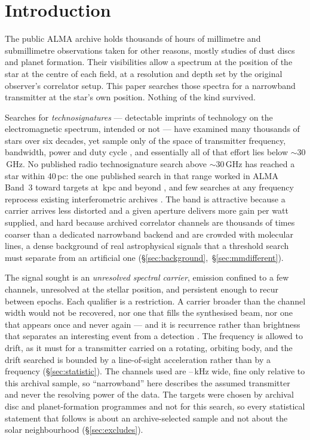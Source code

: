 \section{Introduction}
\label{sec:intro}

The public ALMA archive holds thousands of hours of millimetre and
submillimetre observations taken for other reasons, mostly studies of dust
discs and planet formation. Their visibilities allow a spectrum at the
position of the star at the centre of each field, at a resolution and depth
set by the original observer's correlator setup. This paper searches those
spectra for a narrowband transmitter at the star's own position. Nothing of
the kind survived.

Searches for \emph{technosignatures} --- detectable imprints of technology on
the electromagnetic spectrum, intended or not
\citep{Sheikh2020,SETIreview2025} --- have examined many thousands of stars
over six decades, yet sample only \HaystackFrac{} of the space of transmitter
frequency, bandwidth, power and duty cycle \citep{Wright2018}, and
essentially all of that effort lies below ${\sim}30$\,GHz. No published radio
technosignature search above ${\sim}30$\,GHz has reached a star within
40\,pc: the one published search in that range worked in ALMA Band~3 toward
targets at \MasonNearKpc\,kpc and beyond \citep{Mason2025}, and few searches
at any frequency reprocess existing interferometric archives
\citep{White2026}. The band is attractive because a carrier arrives less
distorted and a given aperture delivers more gain per watt supplied, and hard
because archived correlator channels are thousands of times coarser than a
dedicated narrowband backend and are crowded with molecular lines, a dense
background of real astrophysical signals that a threshold search must
separate from an artificial one
(\S\ref{sec:background},~\S\ref{sec:mmdifferent}).

The signal sought is an \emph{unresolved spectral carrier}, emission confined
to a few channels, unresolved at the stellar position, and persistent enough
to recur between epochs. Each qualifier is a restriction. A carrier broader
than the channel width would not be recovered, nor one that fills the
synthesised beam, nor one that appears once and never again --- and it is
recurrence rather than brightness that separates an interesting event from a
detection \citep{Sheikh2021}. The frequency is allowed to drift, as it must
for a transmitter carried on a rotating, orbiting body, and the drift
searched is bounded by a line-of-sight acceleration rather than by a
frequency (\S\ref{sec:statistic}). The channels used are
\ChanLoA--\ChanHiA\,kHz wide, fine only relative to this archival sample, so
``narrowband'' here describes the assumed transmitter and never the resolving
power of the data. The targets were chosen by archival disc and
planet-formation programmes and not for this search, so every statistical
statement that follows is about an archive-selected sample and not about the
solar neighbourhood (\S\ref{sec:excludes}).
